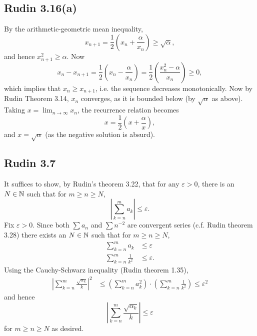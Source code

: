 \documentclass{../mathnotes}
\begin{document}
\subsection*{Rudin 3.16(a)}
By the arithmetic-geometric mean inequality,
\[x_{n+1}=\frac{1}{2}\left( x_n+\frac{\alpha}{x_n} \right)\geq\sqrt{\alpha},\]
and hence $x_{n+1}^2\geq \alpha$. Now
\[x_n-x_{n+1}=\frac{1}{2}\left( x_n-\frac{\alpha}{x_n} \right)=\frac{1}{2}\left( \frac{x_n^2-\alpha}{x_n} \right)\geq0,\]
which implies that $x_n\geq x_{n+1}$, i.e. the sequence decreases monotonically. Now by Rudin Theorem 3.14,
$x_n$ converges, as it is bounded below (by $\sqrt{\alpha}$ as above). Taking $x=\lim_{n\to\infty}x_n$,
the recurrence relation becomes
\[x=\frac{1}{2}\left( x+\frac{\alpha}{x} \right),\]
and $x=\sqrt{\alpha}$ (as the negative solution is absurd).

\subsection*{Rudin 3.7}
It suffices to show, by Rudin's theorem 3.22, that for any $\varepsilon>0$, there is an $N\in\mathbb{N}$ such
that for $m\geq n\geq N$,
\[\left|\sum_{k=n}^ma_k\right|\leq\varepsilon.\]
Fix $\varepsilon>0$. Since both $\sum a_n$ and $\sum n^{-2}$ are convergent series (c.f. Rudin theorem 3.28)
there exists an $N\in\mathbb{N}$ such that for $m\geq n\geq N$,
\begin{align*}
    \sum_{k=n}^m a_k &\leq\varepsilon\\
    \sum_{k=n}^m \frac{1}{k^2} &\leq\varepsilon.
\end{align*}
Using the Cauchy-Schwarz inequality (Rudin theorem 1.35),
\begin{align*}
    \left|\sum_{k=n}^m\frac{\sqrt{\alpha_k}}{k}\right|^2 &\leq \left(\sum_{k=n}^ma_k^2\right)\cdot\left(\sum_{k=n}^m\frac{1}{k^2}\right)\leq\varepsilon^2
\end{align*}
and hence
\[ \left|\sum_{k=n}^m\frac{\sqrt{\alpha_k}}{k}\right|\leq\varepsilon\]
for $m\geq n\geq N$ as desired.
\end{document}
